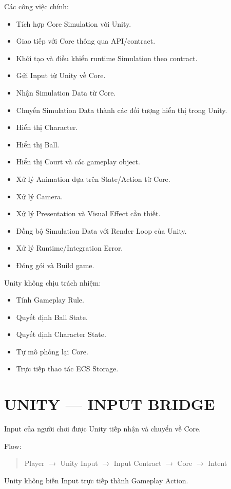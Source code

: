 \documentclass[12pt,a4paper]{article}
\newcommand{\flow}[1]{%
  \begin{quote}\centering\ttfamily #1\end{quote}%
}
\begin{document}
Các công việc chính:
\begin{itemize}[nosep]
  \item Tích hợp Core Simulation với Unity.
  \item Giao tiếp với Core thông qua API/contract.
  \item Khởi tạo và điều khiển runtime Simulation theo contract.
  \item Gửi Input từ Unity về Core.
  \item Nhận Simulation Data từ Core.
  \item Chuyển Simulation Data thành các đối tượng hiển thị trong Unity.
  \item Hiển thị Character.
  \item Hiển thị Ball.
  \item Hiển thị Court và các gameplay object.
  \item Xử lý Animation dựa trên State/Action từ Core.
  \item Xử lý Camera.
  \item Xử lý Presentation và Visual Effect cần thiết.
  \item Đồng bộ Simulation Data với Render Loop của Unity.
  \item Xử lý Runtime/Integration Error.
  \item Đóng gói và Build game.
\end{itemize}

Unity không chịu trách nhiệm:
\begin{itemize}[nosep]
  \item Tính Gameplay Rule.
  \item Quyết định Ball State.
  \item Quyết định Character State.
  \item Tự mô phỏng lại Core.
  \item Trực tiếp thao tác ECS Storage.
\end{itemize}

\section{UNITY --- INPUT BRIDGE}

Input của người chơi được Unity tiếp nhận và chuyển về Core.

Flow:

\flow{Player $\rightarrow$ Unity Input $\rightarrow$ Input Contract $\rightarrow$ Core $\rightarrow$ Intent}

Unity không biến Input trực tiếp thành Gameplay Action.
\end{document}
